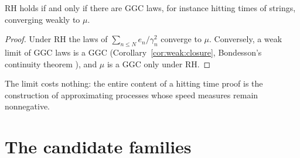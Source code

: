 \begin{proposition}\label{ht:prop:red}
RH holds if and only if there are GGC laws, for instance hitting times of strings, converging weakly to $\mu$.
\end{proposition}

\begin{proof}
Under RH the laws of $\sum_{n\le N}e_n/\gamma_n^2$ converge to $\mu$. Conversely, a weak limit of GGC laws is a GGC (Corollary~\ref{cor:weak:closure}, Bondesson's continuity theorem \cite{Bondesson}), and $\mu$ is a GGC only under RH.
\end{proof}

The limit costs nothing: the entire content of a hitting time proof is the construction of approximating processes whose speed measures remain nonnegative.

\section{The candidate families}\label{ht:sec:families}


